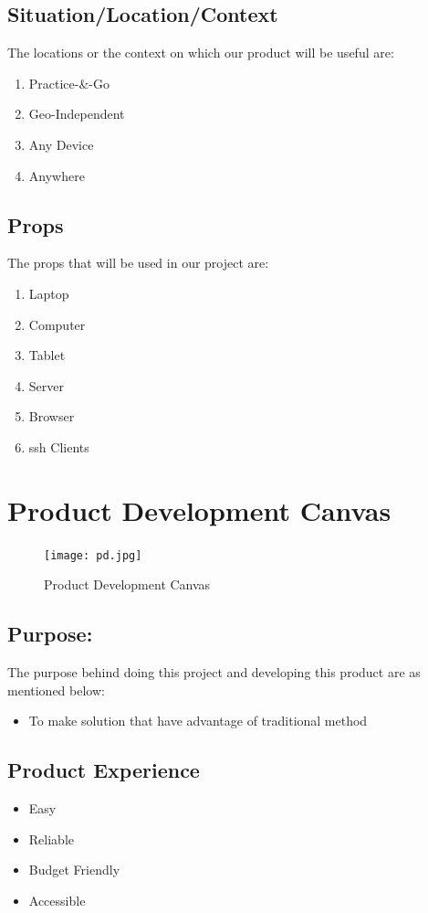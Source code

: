 \documentclass[12pt,a4paper,final,oneside]{report}
\begin{document}
	\subsection{Situation/Location/Context}
	The locations or the context on which our product will be useful are:
	\textbf{}
	\begin{enumerate}
	\item Practice-\&-Go
	\item Geo-Independent
	\item Any Device
	\item Anywhere
	\end{enumerate}
	\subsection{Props}
	\textbf{}
The props that will be used in our project are:
\begin{enumerate}
\item Laptop
\item Computer
\item Tablet
\item Server
\item Browser
\item ssh Clients
\end{enumerate}
\newpage
	\raggedright
	\section{Product Development Canvas}	
	\begin{figure}[h!]
		\centering
		\texttt{[image: pd.jpg]}
		\caption{Product Development Canvas}
		
	\end{figure}
	\textbf{}
	\noindent \subsection{ Purpose:}
	The purpose behind doing this project and developing this product are as mentioned below:\\
	\textbf{}
	\begin{itemize}
	\item To make solution that have advantage of traditional method
	\end{itemize}
	\subsection{Product Experience}
	\begin{itemize}
	\item Easy
	\item Reliable
	\item Budget Friendly
	\item Accessible
	\end{itemize}
\end{document}

